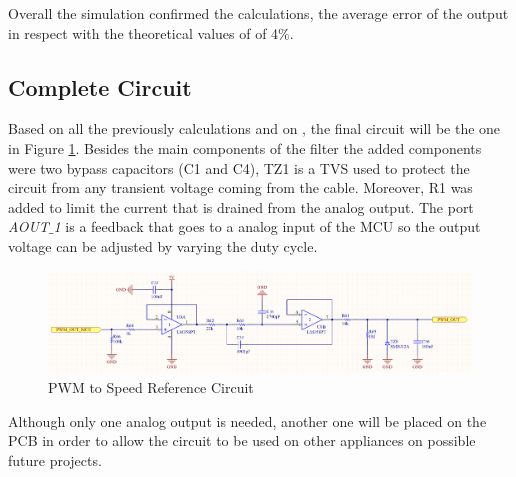 		Overall the simulation confirmed the calculations, the average error of the output in respect with the theoretical values of of 4$\%$.

	\subsection{Complete Circuit}\label{ssec:pwm-to-speed-reference-circuit}
	
		Based on all the previously calculations and on \cite{texas1999sallenkey}, the final circuit will be the one in Figure \ref{fig:pwmToSpeedReferenceCircuit}. Besides the main components of the filter the added components were two bypass capacitors (C1 and C4), TZ1 is a TVS used to protect the circuit from any transient voltage coming from the cable. Moreover, R1 was added to limit the current that is drained from the analog output. The port \textit{AOUT$\_$1} is a feedback that goes to a analog input of the MCU so the output voltage can be adjusted by varying the duty cycle.

	
		\begin{figure}[htbp]
			\centering
			\includegraphics[width=1\textwidth]{figuras/fig-pwmToSpeedReferenceCircuit}
			\caption{PWM to Speed Reference Circuit}
			\label{fig:pwmToSpeedReferenceCircuit}
		\end{figure}

		Although only one analog output is needed, another one will be placed on the PCB in order to allow the circuit to be used on other appliances on possible future projects.
